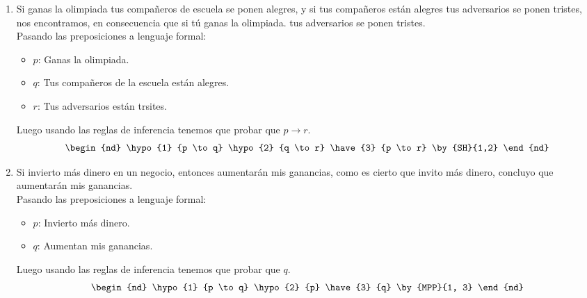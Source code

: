 \documentclass[a4paper,10pt]{article}
\begin{document}
\begin{enumerate}
\item Si ganas la olimpiada tus compañeros de escuela se ponen alegres, y si tus compañeros están alegres tus adversarios se ponen tristes, nos encontramos, en consecuencia que si tú ganas la olimpiada. tus adversarios se ponen tristes.\\
Pasando las preposiciones a lenguaje formal:
\begin{itemize}
 \item \(p\): Ganas la olimpiada.
 \item \(q\): Tus compañeros de la escuela están alegres.
 \item \(r\): Tus adversarios están trsites.
\end{itemize}
Luego usando las reglas de inferencia tenemos que probar que \(p \to r\).
\[
 \begin{nd}
   \hypo {1} {p \to q}
   \hypo {2} {q \to r}
   \have {3} {p \to r} \by{SH}{1,2}
 \end{nd}
\]
\item Si invierto más dinero en un negocio, entonces aumentarán mis ganancias, como es cierto que invito más dinero, concluyo que aumentarán mis ganancias.\\
Pasando las preposiciones a lenguaje formal:
\begin{itemize}
 \item \(p\): Invierto más dinero.
 \item \(q\): Aumentan mis ganancias.
\end{itemize}
Luego usando las reglas de inferencia tenemos que probar que \(q\).
\[
 \begin{nd}
  \hypo {1} {p \to q}
  \hypo {2} {p}
  \have {3} {q} \by{MPP}{1, 3}
 \end{nd}
\]

\end{enumerate} 
\end{document}
